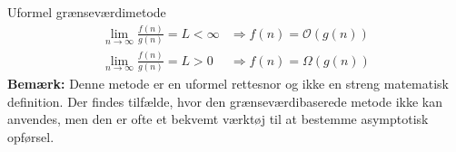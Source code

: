         \begin{custombox}{Uformel grænseværdimetode}
            \[
                \begin{array}{ll}
                \displaystyle \lim_{n \to \infty} \frac{f(n)}{g(n)} = L<\infty & \Rightarrow f(n) = \mathcal{O}(g(n)) \\[10pt]
                \displaystyle \lim_{n \to \infty} \frac{f(n)}{g(n)} = L>0 & \Rightarrow f(n) = \Omega(g(n))
                \end{array}
                \]
                \medskip
                \textbf{Bemærk:} Denne metode er en uformel rettesnor og ikke en streng matematisk definition. Der findes tilfælde, hvor den grænseværdibaserede metode ikke kan anvendes, men den er ofte et bekvemt værktøj til at bestemme asymptotisk opførsel.
        \end{custombox}
